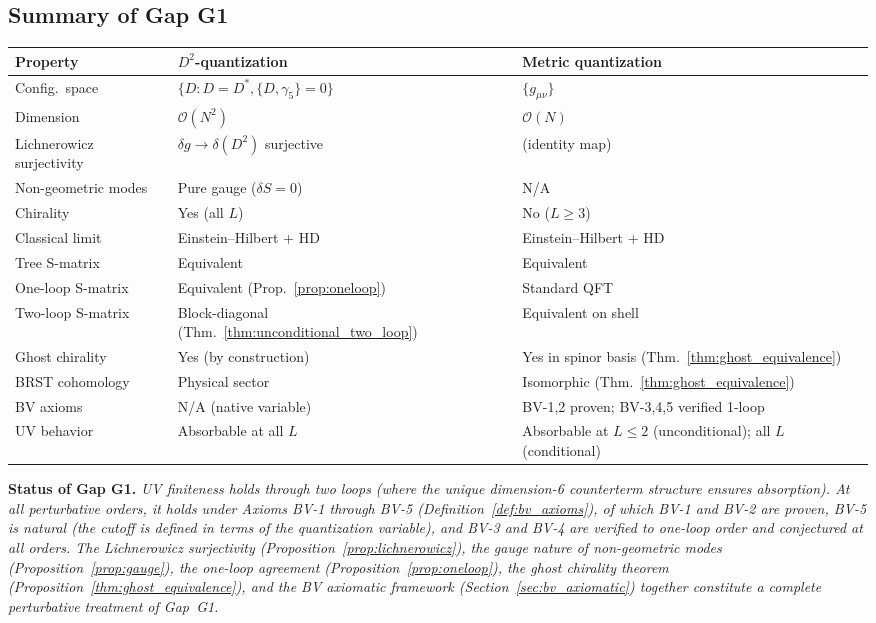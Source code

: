 \documentclass[12pt,a4paper]{article}
\theoremstyle{definition}
\theoremstyle{remark}
\newcommand{\order}{\mathcal{O}}
\begin{document}
\subsection{Summary of Gap G1}

\begin{center}
\small
\begin{tabular}{@{}lll@{}}
\toprule
Property & $D^2$-quantization & Metric quantization \\
\midrule
Config.\ space & $\{D : D\!=\!D^*, \{D, \gamma_5\}\!=\!0\}$
               & $\{g_{\mu\nu}\}$ \\
Dimension & $\order(N^2)$ & $\order(N)$ \\
Lichnerowicz surjectivity & $\delta g \to \delta(D^2)$ surjective
                          & (identity map) \\
Non-geometric modes & Pure gauge ($\delta S = 0$) & N/A \\
Chirality & Yes (all $L$) & No ($L \geq 3$) \\
Classical limit & Einstein--Hilbert + HD & Einstein--Hilbert + HD \\
Tree S-matrix & Equivalent & Equivalent \\
One-loop S-matrix & Equivalent (Prop.~\ref{prop:oneloop}) & Standard QFT \\
Two-loop S-matrix & Block-diagonal (Thm.~\ref{thm:unconditional_two_loop})
                  & Equivalent on shell \\
Ghost chirality & Yes (by construction) &
  Yes in spinor basis (Thm.~\ref{thm:ghost_equivalence}) \\
BRST cohomology & Physical sector & Isomorphic
  (Thm.~\ref{thm:ghost_equivalence}) \\
BV axioms & N/A (native variable)
          & BV-1,2 proven; BV-3,4,5 verified 1-loop \\
UV behavior & Absorbable at all $L$
            & Absorbable at $L \leq 2$ (unconditional);
              all $L$ (conditional) \\
\bottomrule
\end{tabular}
\end{center}

\medskip
\noindent\textbf{Status of Gap G1.}
\emph{UV finiteness holds through two loops (where the unique dimension-6
counterterm structure ensures absorption).
At all perturbative orders, it holds under Axioms BV-1 through BV-5
(Definition~\ref{def:bv_axioms}), of which BV-1 and BV-2 are proven,
BV-5 is natural (the cutoff is defined in terms of the quantization variable),
and BV-3 and BV-4 are verified to one-loop order and conjectured at all orders.
The Lichnerowicz surjectivity (Proposition~\ref{prop:lichnerowicz}), the gauge
nature of non-geometric modes (Proposition~\ref{prop:gauge}), the one-loop
agreement (Proposition~\ref{prop:oneloop}), the ghost chirality theorem
(Proposition~\ref{thm:ghost_equivalence}), and the BV axiomatic framework
(Section~\ref{sec:bv_axiomatic}) together constitute a complete perturbative
treatment of Gap~G1.}
\end{document}
